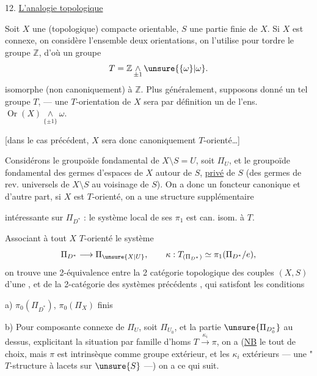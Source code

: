 
12. \uline{L'analogie topologique}\par\nobreak
Soit \(X\) une  (topologique) compacte
orientable, \(S\) une partie finie de \(X\). Si \(X\) est connexe, on considère
l'ensemble \inserted{\unsure{\(\omega\)}}  deux orientations,
on l'utilise pour tordre le groupe \(\mathbb Z\), d'où un groupe 
\[
T=\mathbb Z\mathop{\wedge}\limits_{\pm1}\unsure{\{\omega\}|\omega}.
\]
isomorphe (non canoniquement) à \(\mathbb Z\). Plus généralement, supposons
donné un tel groupe \(T\),
--- une \(T\)-orientation de \(X\) sera par définition un 
de l'ens. \(\operatorname{Or}(X)\mathop{\wedge}\limits_{\{\pm1\}}\omega\).

[dans le cas précédent, \(X\) sera donc canoniquement \(T\)-orienté\ldots]

Considérons le groupoïde fondamental de \(X\setminus S=U\), soit \(\Pi_U\),
et le groupoïde fondamental  des germes
d'espaces de \(X\) autour de \(S\), \uline{privé} de \(S\)
(des germes de rev. universels de \(X\setminus S\) au voisinage de \(S\)).
On a donc un foncteur canonique
et d'autre part,  si \(X\) est \(T\)-orienté, on a une
structure supplémentaire



intéressante sur  \(\Pi_{D^*}\) : le système local de
ses \(\pi_1\) est can. isom. à \(T\).

Associant à tout \(X\) \(T\)-orienté le système
\[
\Pi_{D^*}\longrightarrow\Pi_{\unsure{X|U}},\qquad
\kappa:T_{(\Pi_{D^*})}\simeq\pi_1(\Pi_{D^*}/e),
\]
on trouve une 2-équivalence entre la 2 catégorie topologique des
 couples \((X,S)\) d'une
, et de la 2-catégorie des systèmes
précédents , \unsure{(}qui satisfont les conditions

a) \(\pi_0(\Pi_{D^*})\),  \(\pi_0(\Pi_X)\) finis

b) Pour  composante connexe de \(\Pi_U\), soit
\(\Pi_{U_0}\), et la partie \(\unsure{\Pi_{D_0^*}}\) au dessus, explicitant la
situation  par 
 famille d'homs
\(T\xrightarrow{\kappa_i}\pi\), on a (\uline{NB} le tout  de choix,
mais \(\pi\) est intrinsèque comme groupe extérieur, et les \(\kappa_i\)
 extérieurs ---  une "\(T\)-structure à lacets
sur \(\unsure{S}\) ---) on a ce qui suit.

